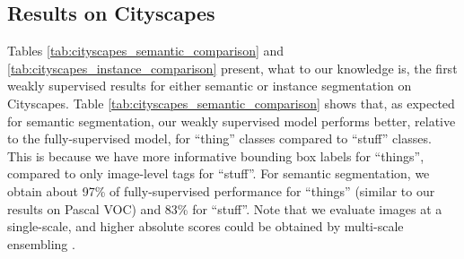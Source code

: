 \documentclass[runningheads]{llncs}
\begin{document}
\subsection{Results on Cityscapes}
\label{sec:results_cityscapes}
Tables \ref{tab:cityscapes_semantic_comparison} and \ref{tab:cityscapes_instance_comparison} present, what to our knowledge is, the first weakly supervised results for either semantic or instance segmentation on Cityscapes.
Table \ref{tab:cityscapes_semantic_comparison} shows that, as expected for semantic segmentation, our weakly supervised model performs better, relative to the fully-supervised model, for ``thing'' classes compared to ``stuff'' classes.
This is because we have more informative bounding box labels for ``things'', compared to only image-level tags for ``stuff''.
For semantic segmentation, we obtain about 97\% of fully-supervised performance for ``things'' (similar to our results on Pascal VOC) and 83\% for ``stuff''.
Note that we evaluate images at a single-scale, and higher absolute scores could be obtained by multi-scale ensembling \cite{zhao_cvpr_2017,chen_arxiv_2016}.
\end{document}
